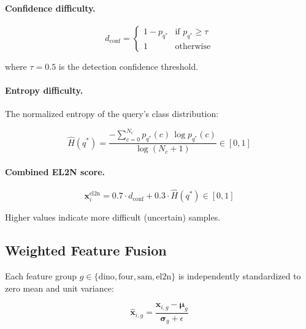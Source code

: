 \paragraph{Confidence difficulty.}

\begin{equation}
    d_{\text{conf}} =
    \begin{cases}
        1 - p_{q^*} & \text{if } p_{q^*} \geq \tau \\
        1           & \text{otherwise}
    \end{cases}
\end{equation}

where $\tau = 0.5$ is the detection confidence threshold.

\paragraph{Entropy difficulty.}
The normalized entropy of the query's class distribution:

\begin{equation}
    \hat{H}(q^*) = \frac{-\sum_{c=0}^{N_c} p_{q^*}(c)\,\log p_{q^*}(c)}
                        {\log(N_c + 1)}
    \in [0, 1]
\end{equation}

\paragraph{Combined EL2N score.}

\begin{equation}
    \mathbf{x}_i^{\text{el2n}} = 0.7 \cdot d_{\text{conf}}
                                + 0.3 \cdot \hat{H}(q^*)
    \in [0, 1]
\end{equation}

Higher values indicate more difficult (uncertain) samples.

\subsection{Weighted Feature Fusion}
\label{sec:fusion}

Each feature group $g \in \{\text{dino}, \text{four}, \text{sam}, \text{el2n}\}$
is independently standardized to zero mean and unit variance:

\begin{equation}
    \hat{\mathbf{x}}_{i,g} =
    \frac{\mathbf{x}_{i,g} - \boldsymbol{\mu}_g}{\boldsymbol{\sigma}_g + \epsilon}
\end{equation}

